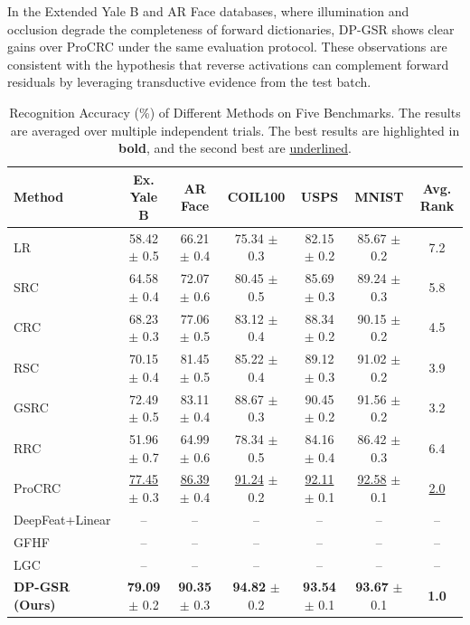 \documentclass[10pt,comsoc]{IEEEtran}
\begin{document}
In the Extended Yale B and AR Face databases, where illumination and occlusion degrade the completeness of forward dictionaries, DP-GSR shows clear gains over ProCRC under the same evaluation protocol. These observations are consistent with the hypothesis that reverse activations can complement forward residuals by leveraging transductive evidence from the test batch.

\begin{table}[t]
\renewcommand{\arraystretch}{1.2}
\caption{Recognition Accuracy (\%) of Different Methods on Five Benchmarks. The results are averaged over multiple independent trials. The best results are highlighted in \textbf{bold}, and the second best are \underline{underlined}.}
\label{tab:main_results}
\centering
\begin{tabular}{l|cc|c|c|cc}
\hline
\textbf{Method} & \textbf{Ex. Yale B} & \textbf{AR Face} & \textbf{COIL100} & \textbf{USPS} & \textbf{MNIST} & \textbf{Avg. Rank} \\ \hline
LR              & 58.42 $\pm$ 0.5 & 66.21 $\pm$ 0.4 & 75.34 $\pm$ 0.3 & 82.15 $\pm$ 0.2 & 85.67 $\pm$ 0.2 & 7.2 \\
SRC \cite{wright2009robust} & 64.58 $\pm$ 0.4 & 72.07 $\pm$ 0.6 & 80.45 $\pm$ 0.5 & 85.69 $\pm$ 0.3 & 89.24 $\pm$ 0.3 & 5.8 \\
CRC \cite{zhang2011sparse}  & 68.23 $\pm$ 0.3 & 77.06 $\pm$ 0.5 & 83.12 $\pm$ 0.4 & 88.34 $\pm$ 0.2 & 90.15 $\pm$ 0.2 & 4.5 \\
RSC \cite{yang2011robust}   & 70.15 $\pm$ 0.4 & 81.45 $\pm$ 0.5 & 85.22 $\pm$ 0.4 & 89.12 $\pm$ 0.3 & 91.02 $\pm$ 0.2 & 3.9 \\
GSRC \cite{elhamifar2013robust} & 72.49 $\pm$ 0.5 & 83.11 $\pm$ 0.4 & 88.67 $\pm$ 0.3 & 90.45 $\pm$ 0.2 & 91.56 $\pm$ 0.2 & 3.2 \\
RRC \cite{yang2017robust}   & 51.96 $\pm$ 0.7 & 64.99 $\pm$ 0.6 & 78.34 $\pm$ 0.5 & 84.16 $\pm$ 0.4 & 86.42 $\pm$ 0.3 & 6.4 \\
ProCRC \cite{cai2016probabilistic} & \underline{77.45} $\pm$ 0.3 & \underline{86.39} $\pm$ 0.4 & \underline{91.24} $\pm$ 0.2 & \underline{92.11} $\pm$ 0.1 & \underline{92.58} $\pm$ 0.1 & \underline{2.0} \\
DeepFeat+Linear & -- & -- & -- & -- & -- & -- \\
GFHF \cite{zhu2003semi} & -- & -- & -- & -- & -- & -- \\
LGC \cite{zhou2004learning} & -- & -- & -- & -- & -- & -- \\ \hline
\textbf{DP-GSR (Ours)} & \textbf{79.09} $\pm$ 0.2 & \textbf{90.35} $\pm$ 0.3 & \textbf{94.82} $\pm$ 0.2 & \textbf{93.54} $\pm$ 0.1 & \textbf{93.67} $\pm$ 0.1 & \textbf{1.0} \\ \hline
\end{tabular}
\end{table}
\end{document}

